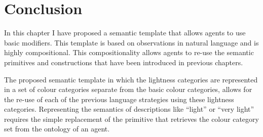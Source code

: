 \section{Conclusion}

In this chapter I have proposed a semantic template that allows
agents to use basic modifiers. This template is based on
observations in natural language and is highly compositional. This
compositionality allows agents to re-use the semantic primitives and
constructions that have been introduced in previous chapters.

The proposed semantic template in which the lightness categories are
represented in a set of colour categories separate from the
basic colour categories, allows for the re-use of each of the
previous language strategies using these lightness
categories. Representing the semantics of descriptions like ``light''
or ``very light'' requires the simple replacement of the primitive that
retrieves the colour category set from the ontology of an agent.